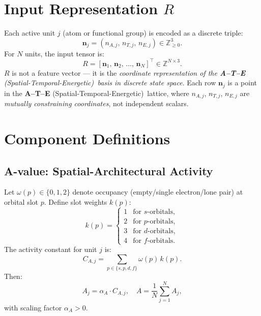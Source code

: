 \documentclass[11pt]{article}
\newcommand{\Z}{\mathbb{Z}}
\newcommand{\ATE}{\textbf{A--T--E} (Spatial-Temporal-Energetic)}
\begin{document}
\section{Input Representation $R$}
\label{sec:input-representation}
Each active unit $j$ (atom or functional group) is encoded as a discrete triple:
\begin{equation}
    \mathbf{n}_j = (n_{A,j},\, n_{T,j},\, n_{E,j}) \in \Z_{\geq 0}^3.
    \label{eq:unit-encoding}
\end{equation}
For $N$ units, the input tensor is:
\begin{equation}
    R = [\mathbf{n}_1,\, \mathbf{n}_2,\, \dots,\, \mathbf{n}_N]^\top \in \Z^{N \times 3}.
    \label{eq:input-tensor}
\end{equation}
$R$ is not a feature vector — it is the \emph{coordinate representation of the \ATE\ basis in discrete state space}. Each row $\mathbf{n}_j$ is a point in the \ATE\ lattice, where $n_{A,j}$, $n_{T,j}$, $n_{E,j}$ are \emph{mutually constraining coordinates}, not independent scalars.

\section{Component Definitions}
\label{sec:components}

\subsection{A-value: Spatial-Architectural Activity}
\label{subsec:a-value}
Let $\omega(p) \in \{0,1,2\}$ denote occupancy (empty/single electron/lone pair) at orbital slot $p$. Define slot weights $k(p)$:
\begin{equation}
    k(p) =
    \begin{cases}
        1 & \text{for } s\text{-orbitals}, \\
        2 & \text{for } p\text{-orbitals}, \\
        3 & \text{for } d\text{-orbitals}, \\
        4 & \text{for } f\text{-orbitals}.
    \end{cases}
    \label{eq:orbital-weights}
\end{equation}
The activity constant for unit $j$ is:
\begin{equation}
    C_{A,j} = \sum_{p \in \{s,p,d,f\}} \omega(p)\, k(p).
    \label{eq:ca-j}
\end{equation}
Then:
\begin{equation}
    A_j = \alpha_A \cdot C_{A,j}, \quad
    A = \frac{1}{N}\sum_{j=1}^N A_j,
    \label{eq:a-j-and-mean}
\end{equation}
with scaling factor $\alpha_A > 0$.
\end{document}
